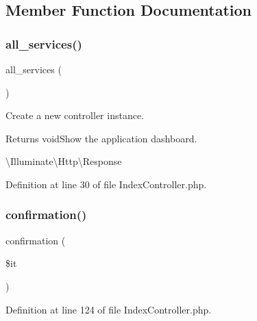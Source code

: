 \subsection{Member Function Documentation}
\mbox{\label{class_responsive_1_1_http_1_1_controllers_1_1_index_controller_a6d5c62abaa3835d4ba5495e55bd19021}} 
\subsubsection{\texorpdfstring{all\_services()}{all\_services()}}
{\footnotesize\ttfamily all\+\_\+services (\begin{DoxyParamCaption}{ }\end{DoxyParamCaption})}

Create a new controller instance.

\begin{DoxyReturn}{Returns}
void\+Show the application dashboard.

\textbackslash{}\+Illuminate\textbackslash{}\+Http\textbackslash{}\+Response 
\end{DoxyReturn}


Definition at line 30 of file Index\+Controller.\+php.

\mbox{\label{class_responsive_1_1_http_1_1_controllers_1_1_index_controller_a75c4acb831d0624f784c3c0e49e0ad32}} 
\subsubsection{\texorpdfstring{confirmation()}{confirmation()}}
{\footnotesize\ttfamily confirmation (\begin{DoxyParamCaption}\item[{}]{\$it }\end{DoxyParamCaption})}



Definition at line 124 of file Index\+Controller.\+php.

\mbox{\label{class_responsive_1_1_http_1_1_controllers_1_1_index_controller_a6c16cb22355fc59b40b28b686284e006}} 
